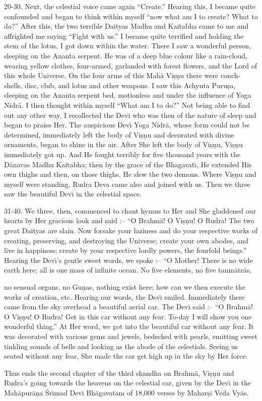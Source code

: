 20-30. Next, the celestial voice came again ``Create.'' Hearing this, I became quite confounded and began to think within myself ``now what am I to create? What to do?'' After this, the two terrible Daityas Madhu and Kaitabha came to me and affrighted me saying ``Fight with us.'' I became quite terrified and holding the stem of the lotus, I got down within the water. There I saw a wonderful person, sleeping on the Ananta serpent. He was of a deep blue colour like a rain-cloud, wearing yellow clothes, four-armed, garlanded with forest flowers, and the Lord of this whole Universe. On the four arms of this Mah\=a Vi\d{s}\d{n}u there were conch-shells, disc, club, and lotus and other weapons. I saw this Achyuta Puru\d{s}a, sleeping on the Ananta serpent bed, motionless and under the influence of Yoga Nidr\=a. I then thought within myself ``What am I to do?'' Not being able to find out any other way, I recollected the Dev\={\i} who was then of the nature of sleep and began to praise Her. The auspicious Dev\={\i} Yoga Nidr\=a, whose form could not be determined, immediately left the body of Vi\d{s}\d{n}u and decorated with divine ornaments, began to shine in the air. After She left the body of Vi\d{s}\d{n}u, Vi\d{s}\d{n}u immediately got up. And He fought terribly for five thousand years with the D\=anavas Madhu Kaitabha; then by the grace of the Bhagavat\={\i}, He extended His own thighs and then, on those thighs, He slew the two demons. Where Vi\d{s}\d{n}u and myself were standing, Rudra Deva came also and joined with us. Then we three saw the beautiful Dev\={\i} in the celestial space.

31-40. We three, then, commenced to chant hymns to Her and She gladdened our hearts by Her gracious look and said :-- ``O Brahm\=a! O Vi\d{s}\d{n}u! O Rudra! The two great Daityas are slain. Now forsake your laziness and do your respective works of creating, preserving, and destroying the Universe; create your own abodes, and live in happiness; create by your respective lordly powers, the fourfold beings.'' Hearing the Dev\={\i}'s gentle sweet words, we spoke :-- ``O Mother! There is no wide earth here; all is one mass of infinite ocean. No five elements, no five tanm\=atr\=as,

no sensual organs, no Gu\d{n}as, nothing exist here; how can we then execute the works of creation, etc. Hearing our words, the Dev\={\i} smiled. Immediately there came from the sky overhead a beautiful aerial car. The Dev\={\i} said :-- ``O Brahm\=a! O Vi\d{s}\d{n}u! O Rudra! Get in this car without any fear. To-day I will show you one wonderful thing.'' At Her word, we got into the beautiful car without any fear. It was decorated with various gems and jewels, bedecked with pearls, emitting sweet tinkling sounds of bells and looking as the abode of the celestials. Seeing us seated without any fear, She made the car get high up in the sky by Her force.

Thus ends the second chapter of the third skandha on Brahm\=a, Vi\d{s}\d{n}u and Rudra's going towards the heavens on the celestial car, given by the Dev\={\i} in the Mah\=apur\=a\d{n}a \'Sr\={\i}mad Dev\={\i} Bh\=agavatam of 18,000 verses by Mahar\d{s}i Veda Vy\=as.



